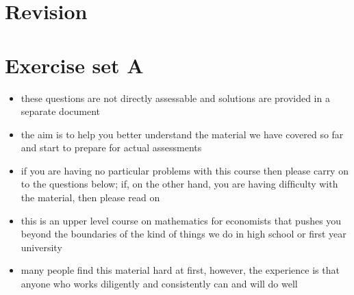 \documentclass[letterpaper,10pt,english]{jupyterBook}
\begin{document}
\sphinxstepscope


\chapter{Revision}
\label{\detokenize{12.revision:revision}}\label{\detokenize{12.revision::doc}}

\sphinxstepscope


\chapter{Exercise set A}
\label{\detokenize{02.exercises.A:exercise-set-a}}\label{\detokenize{02.exercises.A::doc}}
\sphinxAtStartPar
{}
\begin{itemize}
\item {} 
\sphinxAtStartPar
these questions are not directly assessable and solutions are provided in a separate document

\item {} 
\sphinxAtStartPar
the aim is to help you better understand the material we have covered so far and start to prepare for actual assessments

\item {} 
\sphinxAtStartPar
if you are having no particular problems with this course then
please carry on to the questions below; if, on the other hand, you are having difﬁculty with the material, then please read on

\item {} 
\sphinxAtStartPar
this is an upper level course on mathematics for economists that pushes you beyond the boundaries of the kind of things we do in high school or ﬁrst year university

\item {} 
\sphinxAtStartPar
many people ﬁnd this material hard at ﬁrst, however, the experience is that anyone who works diligently and consistently can and will do well

\end{itemize}
\end{document}
